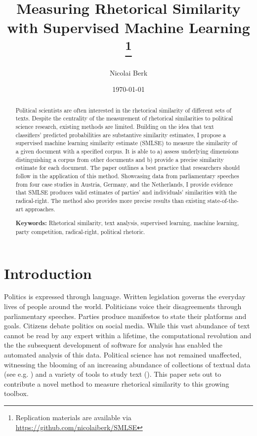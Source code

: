 \documentclass{article}
\title{Measuring Rhetorical Similarity with Supervised Machine Learning
\footnote{Replication materials are available via \href{https://github.com/nicolaiberk/SMLSE}{https://github.com/nicolaiberk/SMLSE}}
}
\author{Nicolai Berk}
\date{\today}
\begin{document}
\maketitle

\begin{abstract}
Political scientists are often interested in the rhetorical similarity of different sets of texts. Despite the centrality of the measurement of rhetorical similarities to political science research, existing methods are limited. Building on the idea that text classifiers' predicted probabilities are substantive similarity estimates, I propose a supervised machine learning similarity estimate (SMLSE) to measure the similarity of a given document with a specified corpus. It is able to a) assess underlying dimensions distinguishing a corpus from other documents and b) provide a precise similarity estimate for each document. The paper outlines a best practice that researchers should follow in the application of this method. Showcasing data from parliamentary speeches from four case studies in Austria, Germany, and the Netherlands, I provide evidence that SMLSE produces valid estimates of parties' and individuals' similarities with the radical-right. The method also provides more precise results than existing state-of-the-art approaches.\par \medskip

\textbf{Keywords:} Rhetorical similarity, text analysis, supervised learning, machine learning, party competition, radical-right, political rhetoric.
\end{abstract}



\section{Introduction}
\label{sec:Intro}
Politics is expressed through language. Written legislation governs the everyday lives of people around the world. Politicians voice their disagreements through parliamentary speeches. Parties produce manifestos to state their platforms and goals. Citizens debate politics on social media. While this vast abundance of text cannot be read by any expert within a lifetime, the computational revolution and the the subsequent development of software for analysis has enabled the automated analysis of this data. Political science has not remained unaffected, witnessing the blooming of an increasing abundance of collections of textual data (see e.g. \cite{Rauh2020, Schumacher2016, Schumacher2019}) and a variety of tools to study text (\cite{Boumans2016, Grimmer2013TextASData}). This paper sets out to contribute a novel method to measure rhetorical similarity to this growing toolbox.\par
\end{document}
